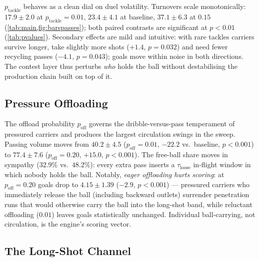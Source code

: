 \documentclass[10pt,twocolumn]{article}
\begin{document}
$p_{\text{tackle}}$ behaves as a clean dial on duel volatility. Turnovers
scale monotonically: $17.9 \pm 2.0$ at $p_{\text{tackle}}=0.01$,
$23.4 \pm 4.1$ at baseline, $37.1 \pm 6.3$ at $0.15$
(\cref{tab:main,fig:barspasses}); both paired contrasts are significant at
$p < 0.01$ (\cref{tab:pvalues}). Secondary effects are mild and
intuitive: with rare tackles carriers survive longer, take slightly more
shots ($+1.4$, $p=0.032$) and need fewer recycling passes ($-4.1$,
$p=0.043$); goals move within noise in both directions. The contest layer
thus perturbs \emph{who} holds the ball without destabilising the
production chain built on top of it.

\subsection{Pressure Offloading}\label{sec:res-off}

The offload probability $p_{\text{off}}$ governs the dribble-versus-pass
temperament of pressured carriers and produces the largest circulation
swings in the sweep. Passing volume moves from $40.2 \pm 4.5$
($p_{\text{off}}=0.01$, $-22.2$ vs.\ baseline, $p<0.001$) to
$77.4 \pm 7.6$ ($p_{\text{off}}=0.20$, $+15.0$, $p<0.001$). The
free-ball share moves in sympathy ($32.9\%$ vs.\ $48.2\%$): every extra
pass inserts a $\tau_{\text{loose}}$ in-flight window in which nobody
holds the ball. Notably, \emph{eager offloading hurts scoring}: at
$p_{\text{off}}=0.20$ goals drop to $4.15 \pm 1.39$ ($-2.9$,
$p<0.001$) --- pressured carriers who immediately release the ball
(including backward outlets) surrender penetration runs that would
otherwise carry the ball into the long-shot band, while reluctant
offloading ($0.01$) leaves goals statistically unchanged. Individual
ball-carrying, not circulation, is the engine's scoring vector.

\subsection{The Long-Shot Channel}\label{sec:res-long}
\end{document}
